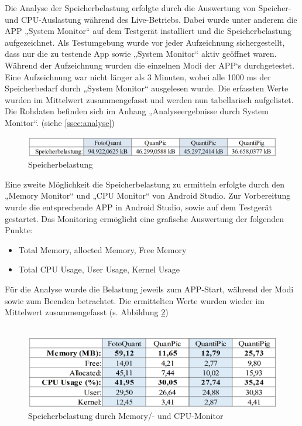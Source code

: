 Die Analyse der Speicherbelastung erfolgte durch die Auswertung von Speicher- und CPU-Auslastung während des Live-Betriebs. Dabei wurde unter anderem die APP „System Monitor“ auf dem Testgerät installiert und die Speicherbelastung aufgezeichnet. Als Testumgebung wurde vor jeder Aufzeichnung sichergestellt, dass nur die zu testende App sowie „System Monitor“ aktiv geöffnet waren. Während der Aufzeichnung wurden die einzelnen Modi der APP‘s durchgetestet. Eine Aufzeichnung war nicht länger als 3 Minuten, wobei alle 1000 ms der Speicherbedarf durch „System Monitor“ ausgelesen wurde. Die erfassten Werte wurden im Mittelwert zusammengefasst und werden nun tabellarisch aufgelistet. Die Rohdaten befinden sich im Anhang „Analyseergebnisse durch System Monitor“.  (siehe \ref{ssec:analyse})

\begin{figure}[h]
	\centering
		\includegraphics[width=1.0\textwidth]{img/speicherbelastung_klein.png}
	\caption[Speicherbelastung durch System Monitor]{Speicherbelastung}
	\label{fig:speicherbel_apps}
\end{figure}

Eine zweite Möglichkeit die Speicherbelastung zu ermitteln erfolgte durch den „Memory Monitor“ und „CPU Monitor“ von Android Studio. Zur Vorbereitung wurde die entsprechende APP in Android Studio, sowie auf dem Testgerät gestartet. Das Monitoring ermöglicht eine grafische Auswertung der folgenden Punkte:

\begin{itemize}
\item Total Memory, allocted Memory, Free Memory
\item Total CPU Usage, User Usage, Kernel Usage
\end{itemize}

Für die Analyse wurde die Belastung jeweils zum APP-Start, während der Modi sowie zum Beenden betrachtet. Die ermittelten Werte wurden wieder im Mittelwert zusammengefasst (s. Abbildung \ref{fig:speicherbel2_apps})\\\

\begin{figure}[h]
	\centering
		\includegraphics[width=1.0\textwidth]{img/speicherbelastung_gross.png}
	\caption[Speicherbelastung durch Memory/- und CPU-Monitor]{Speicherbelastung durch Memory/- und CPU-Monitor}
	\label{fig:speicherbel2_apps}
\end{figure} 

